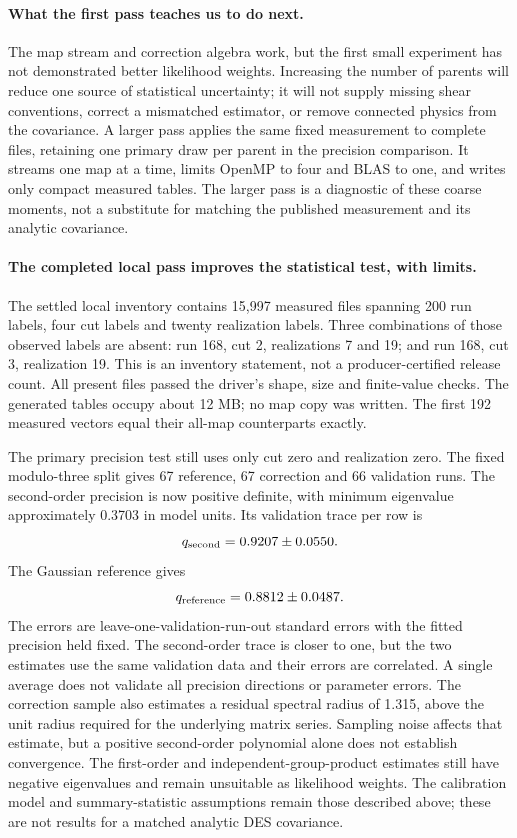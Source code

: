 \documentclass[11pt]{article}
\begin{document}
\paragraph{What the first pass teaches us to do next.}
The map stream and correction algebra work, but the first small experiment
has not demonstrated better likelihood weights. Increasing the number of
parents will reduce one source of statistical uncertainty; it will not
supply missing shear conventions, correct a mismatched estimator, or remove
connected physics from the covariance. A larger pass applies the same fixed
measurement to complete files, retaining one primary draw per parent in
the precision comparison. It streams one map at a time, limits OpenMP to
four and BLAS to one, and writes only compact measured tables. The larger
pass is a diagnostic of these coarse moments, not a substitute for matching
the published measurement and its analytic covariance.

\paragraph{The completed local pass improves the statistical test, with limits.}
The settled local inventory contains 15,997 measured files spanning 200 run
labels, four cut labels and twenty realization labels. Three combinations
of those observed labels are absent: run 168, cut 2, realizations 7 and 19;
and run 168, cut 3, realization 19. This is an inventory statement, not a
producer-certified release count. All present files passed the driver's
shape, size and finite-value checks. The generated tables occupy about
12 MB; no map copy was written. The first 192 measured vectors equal their
all-map counterparts exactly.

The primary precision test still uses only cut zero and realization zero.
The fixed modulo-three split gives 67 reference, 67 correction and 66
validation runs. The second-order precision is now positive definite, with
minimum eigenvalue approximately 0.3703 in model units. Its validation
trace per row is
\begin{equation}
 q_{\rm second}=0.9207\pm0.0550.
\end{equation}
The Gaussian reference gives
\begin{equation}
 q_{\rm reference}=0.8812\pm0.0487.
\end{equation}
The errors are leave-one-validation-run-out standard errors with the fitted
precision held fixed. The second-order trace is closer to one, but the two
estimates use the same validation data and their errors are correlated.
A single average does not validate all precision directions or parameter
errors. The correction sample also estimates a residual spectral radius of
1.315, above the unit radius required for the underlying matrix series.
Sampling noise affects that estimate, but a positive second-order polynomial
alone does not establish convergence. The first-order and independent-group-product estimates still have
negative eigenvalues and remain unsuitable as likelihood weights. The
calibration model and summary-statistic assumptions remain those described
above; these are not results for a matched analytic DES covariance.
\end{document}
